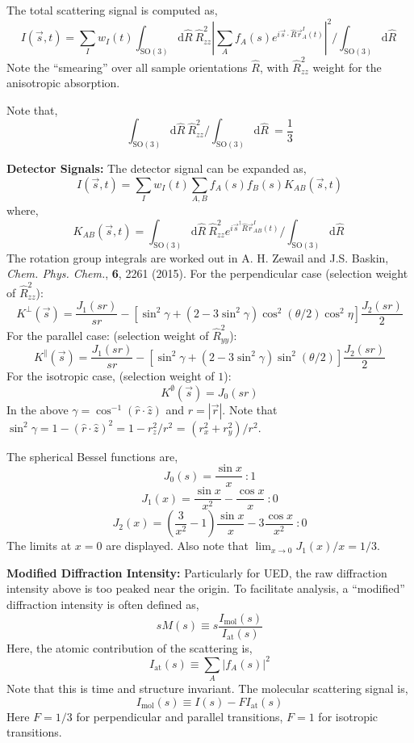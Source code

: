 \documentclass[fleqn,oneside,12pt]{article}
\begin{document}
The total scattering signal is computed as,
\[
I (\vec s, t)
=
\sum_{I}
w_{I} (t)
\int_{\mathrm{SO(3)}}
\mathrm{d} \hat R \
\hat R_{zz}^2
\left |
\sum_{A}
f_{A} (s)
e^{i \vec s \cdot \hat R \vec r_{A}^{I} (t)}
\right |^2
/ 
\int_{\mathrm{SO(3)}}
\mathrm{d} \hat R \
\]
Note the ``smearing'' over all sample orientations $\hat R$, with $\hat
R_{zz}^2$ weight for the anisotropic absorption.

Note that,
\[
\int_{\mathrm{SO(3)}}
\mathrm{d} \hat R \
\hat R_{zz}^2
/ 
\int_{\mathrm{SO(3)}}
\mathrm{d} \hat R \
=
\frac{1}{3}
\]

\textbf{Detector Signals:} The detector signal can be expanded as,
\[
I (\vec s, t)
=
\sum_{I}
w_{I} (t)
\sum_{A, B}
f_{A} (s)
f_{B} (s)
K_{AB} (\vec s, t)
\]
where,
\[
K_{AB} (\vec s, t)
=
\int_{\mathrm{SO(3)}}
\mathrm{d} \hat R \
\hat R_{zz}^2
e^{i \vec s^{\dagger} \hat R \vec r_{AB}^{I} (t)}
/
\int_{\mathrm{SO(3)}}
\mathrm{d} \hat R \
\]
The rotation group integrals are worked out in A. H. Zewail and J.S. Baskin,
\textit{Chem. Phys. Chem.}, \textbf{6}, 2261 (2015). For the perpendicular case
(selection weight of $\hat R_{zz}^2$):
\[
K^{\perp} (\vec s)
=
\frac{J_{1} (s r)}{sr}
-
\left [
\sin^2 \gamma
+
(
2 
-
3 
\sin^2 \gamma
)
\cos^2 (\theta / 2)
\cos^2 \eta
\right ]
\frac{J_{2} (s r)}{2}
\]
For the parallel case:
(selection weight of $\hat R_{yy}^2$):
\[
K^{\parallel} (\vec s)
=
\frac{J_{1} (s r)}{sr}
-
\left [
\sin^2 \gamma
+
(
2 
-
3 
\sin^2 \gamma
)
\sin^2 (\theta / 2)
\right ]
\frac{J_{2} (s r)}{2}
\]
For the isotropic case,
(selection weight of $1$):
\[
K^{\emptyset} (\vec s)
=
J_{0} (sr)
\]
In the above $\gamma = \cos^{-1} (\hat r \cdot \hat z)$ and $r = | \vec r |$.
Note that $\sin^2 \gamma = 1 - (\hat r \cdot \hat z)^2 = 1 - r_{z}^2 / r^2$ =
$(r_{x}^2 + r_{y}^2) / r^2$.

The spherical Bessel functions are,
\[
J_{0} (s)
=
\frac{\sin x}{x}
\
:
1
\]
\[
J_{1} (x)
=
\frac{\sin x}{x^2}
-
\frac{\cos x}{x}
\
:
0
\]
\[
J_{2} (x)
=
\left (
\frac{3}{x^2} - 1
\right )
\frac{\sin x}{x}
-
3
\frac{\cos x}{x^2}
\
:
0
\]
The limits at $x = 0$ are displayed. Also note that $\lim_{x \rightarrow 0} J_{1}
(x) / x = 1 /3$.

\textbf{Modified Diffraction Intensity:} Particularly for UED, the raw
diffraction intensity above is too peaked near the origin. To facilitate
analysis, a ``modified'' diffraction intensity is often defined as,
\[
s M(s)
\equiv
s
\frac{I_{\mathrm{mol}} (s)}{I_{\mathrm{at}} (s)}
\]
Here, the atomic contribution of the scattering is,
\[
I_{\mathrm{at}} (s)
\equiv
\sum_{A} | f_{A} (s) |^2
\]
Note that this is time and structure invariant. The molecular scattering signal
is,
\[
I_{\mathrm{mol}} (s)
\equiv
I (s)
-
F
I_{\mathrm{at}} (s)
\]
Here $F = 1/3$ for perpendicular and parallel transitions, $F=1$ for isotropic
transitions. 
\end{document}
